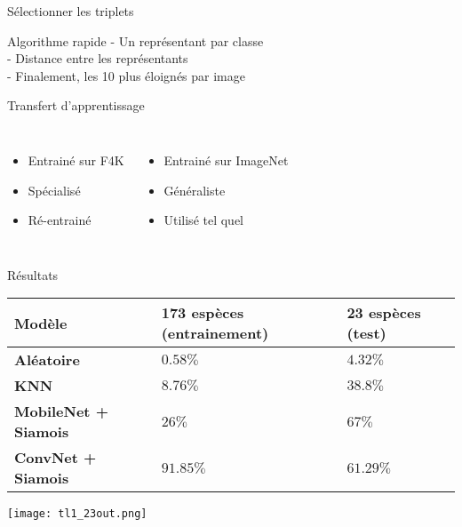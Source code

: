 \documentclass{falconbeamer}
\begin{document}
\begin{frame}{Sélectionner les triplets}
	
	\begin{center}
	\end{center}
	
	\begin{block}{Algorithme rapide}
		- Un représentant par classe\\
		- Distance entre les représentants\\
		- Finalement, les 10 plus éloignés par image
	\end{block}

\end{frame}

\begin{frame}{Transfert d'apprentissage}
	\begin{center}
		\medskip
		\begin{columns}
			\begin{itemize}
				\item Entrainé sur F4K
				\item Spécialisé
				\item Ré-entrainé
			\end{itemize}
		
			\begin{itemize}
				\item Entrainé sur ImageNet
				\item Généraliste
				\item Utilisé tel quel
			\end{itemize}
		\end{columns}
		
	\end{center}
\end{frame}

\begin{frame}{Résultats}
	\begin{tabular}{ |m{10em}|m{8em}|m{8em}| }
		\hline
		Modèle & \textbf{173 espèces (entrainement)} & \textbf{23 espèces (test)} \\
		\hline
		\textbf{Aléatoire} & $0.58\%$ & $4.32\%$ \\
		\textbf{KNN} & $8.76\%$ & $38.8\%$ \\
		\textbf{MobileNet + Siamois} & $26\%$ & $67\%$ \\
		\textbf{ConvNet + Siamois} & $91.85\%$ & $61.29\%$ \\
		\hline
	\end{tabular}
	\begin{center}
		\texttt{[image: tl1\_23out.png]}
	\end{center}
\end{frame}
\end{document}
